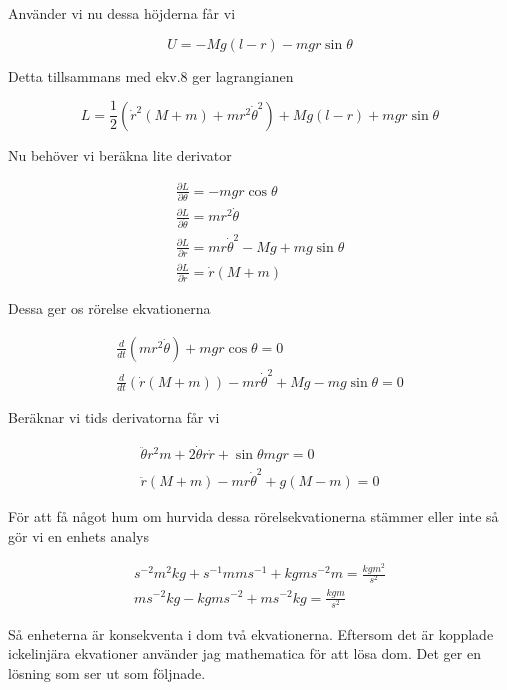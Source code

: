 \documentclass[a4paper]{article}
\begin{document}
Använder vi nu dessa höjderna får vi

\begin{equation}
    U = -Mg(l-r) - mgr\sin\theta
\end{equation}

Detta tillsammans med ekv.8 ger lagrangianen

\begin{equation}
    L = \frac{1}{2}(\dot{r}^2(M+m)+ mr^2\dot{\theta}^2) +Mg(l-r) + mgr\sin\theta
\end{equation}

Nu behöver vi beräkna lite derivator

\begin{align}
    \frac{\partial L}{\partial \theta} = -mgr\cos\theta \\
    \frac{\partial L}{\partial \dot{\theta}} = mr^2\dot{\theta}\\
    \frac{\partial L}{\partial r} = mr\dot{\theta}^2 - Mg + mg\sin\theta \\
    \frac{\partial L}{\partial \dot{r}} = \dot{r}(M+m)
\end{align}

Dessa ger os rörelse ekvationerna

\begin{align}
    \frac{d}{dt}(mr^2\dot{\theta}) + mgr\cos\theta = 0 \\
    \frac{d}{dt}(\dot{r}(M+m)) - mr\dot{\theta}^2 + Mg - mg\sin\theta = 0
\end{align}

Beräknar vi tids derivatorna får vi 

\begin{align}
    \ddot{\theta}r^2m + 2\dot{\theta}r\dot{r} + \sin\theta mgr = 0\\
    \ddot{r}(M+m)-mr\dot{\theta}^2 + g(M-m) = 0
\end{align}

För att få något hum om hurvida dessa rörelsekvationerna stämmer eller inte så gör vi en enhets analys

\begin{align}
    s^{-2}m^2kg + s^{-1}m m s^{-1} + kg m s^{-2} m = \frac{kg m^2}{s^2}\\
    ms^{-2} kg - kg m s^{-2} + ms^{-2} kg = \frac{kgm}{s^2} 
\end{align}

Så enheterna är konsekventa i dom två ekvationerna. Eftersom det är kopplade ickelinjära ekvationer använder jag mathematica för att lösa dom. Det ger en lösning som ser ut som följnade. 
\end{document}
